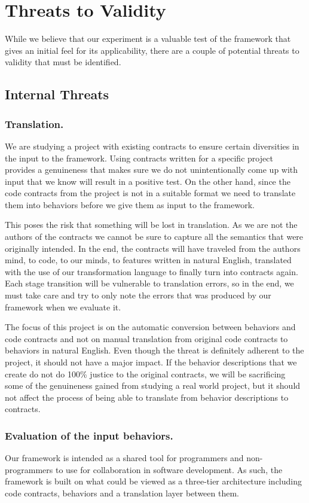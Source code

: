 \section{Threats to Validity}
While we believe that our experiment is a valuable test of the framework that gives an initial feel for its applicability, there are a couple of potential threats to validity that must be identified.

\subsection{Internal Threats}
\subsubsection{Translation.}
We are studying a project with existing contracts to ensure certain diversities in the input to the framework.
Using contracts written for a specific project provides a genuineness that makes sure we do not unintentionally come up with input that we know will result in a positive test.
On the other hand, since the code contracts from the project is not in a suitable format we need to translate them into behaviors before we give them as input to the framework.
 
This poses the risk that something will be lost in translation.
As we are not the authors of the contracts we cannot be sure to capture all the semantics that were originally intended.
In the end, the contracts will have traveled from the authors mind, to code, to our minds, to features written in natural English, translated with the use of our transformation language to finally turn into contracts again.
Each stage transition will be vulnerable to translation errors, so in the end, we must take care and try to only note the errors that was produced by our framework when we evaluate it.
 
The focus of this project is on the automatic conversion between behaviors and code contracts and not on manual translation from original code contracts to behaviors in natural English. Even though the threat is definitely adherent to the project, it should not have a major impact.
If the behavior descriptions that we create do not do 100\%  justice to the original contracts, we will be sacrificing some of the genuineness gained from studying a real world project, but it should not affect the process of being able to translate from behavior descriptions to contracts.

\subsubsection{Evaluation of the input behaviors.}
Our framework is intended as a shared tool for programmers and non-programmers to use for collaboration in software development.
As such, the framework is built on what could be viewed as a three-tier architecture including code contracts, behaviors and a translation layer between them.
 
